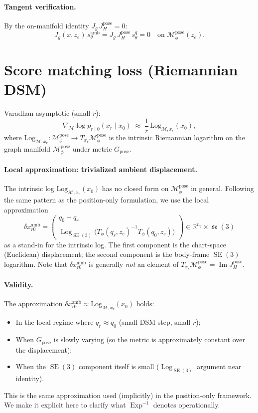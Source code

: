 \documentclass[11pt,a4paper]{article}
\DeclareMathOperator{\Exp}{Exp}
\DeclareMathOperator{\Log}{Log}
\DeclareMathOperator{\Image}{Im}
\DeclareMathOperator{\SE}{SE}
\DeclareMathOperator{\se}{\mathfrak{se}}
\newcommand{\R}{\mathbb{R}}
\newcommand{\Mset}{\mathcal{M}}
\newcommand{\Mpose}{\mathcal{M}_\phi^{\text{pose}}}
\newcommand{\Tphi}{T_\phi}
\begin{document}
\paragraph{Tangent verification.} By the on-manifold identity $J_g \, J_H^{\text{pose}} = 0$:
\begin{equation}
J_g(x, z_e) \, s_\theta^{\text{amb}} = J_g \, J_H^{\text{pose}} \, s_\theta^q = 0 \quad \text{on } \Mpose(z_e).
\end{equation}

\section{Score matching loss (Riemannian DSM)}
\label{sec:dsm}

Varadhan asymptotic (small $r$):
\begin{equation}
\nabla_{\Mset} \log p_{r \mid 0}(x_r \mid x_0) \;\approx\; \frac{1}{r} \, \mathrm{Log}_{\Mset, x_r}(x_0),
\end{equation}
where $\mathrm{Log}_{\Mset, x_r}: \Mpose \to T_{x_r} \Mpose$ is the intrinsic Riemannian logarithm on the graph manifold $\Mpose$ under metric $G_{\text{pose}}$.

\paragraph{Local approximation: trivialized ambient displacement.} The intrinsic log $\mathrm{Log}_{\Mset, x_r}(x_0)$ has no closed form on $\Mpose$ in general. Following the same pattern as the position-only formulation, we use the local approximation
\begin{equation}
\boxed{ \delta x^{\text{amb}}_{r0} = \begin{pmatrix} q_0 - q_r \\ \Log_{\SE(3)}\!\bigl( \Tphi(q_r, z_e)^{-1} \Tphi(q_0, z_e) \bigr) \end{pmatrix} \in \R^{n_q} \times \se(3) }
\end{equation}
as a stand-in for the intrinsic log. The first component is the chart-space (Euclidean) displacement; the second component is the body-frame $\SE(3)$ logarithm. Note that $\delta x^{\text{amb}}_{r0}$ is generally \emph{not} an element of $T_{x_r} \Mpose = \Image J_H^{\text{pose}}$.

\paragraph{Validity.} The approximation $\delta x^{\text{amb}}_{r0} \approx \mathrm{Log}_{\Mset, x_r}(x_0)$ holds:
\begin{itemize}[noitemsep]
    \item In the local regime where $q_r \approx q_0$ (small DSM step, small $r$);
    \item When $G_{\text{pose}}$ is slowly varying (so the metric is approximately constant over the displacement);
    \item When the $\SE(3)$ component itself is small ($\Log_{\SE(3)}$ argument near identity).
\end{itemize}
This is the same approximation used (implicitly) in the position-only framework. We make it explicit here to clarify what $\Exp^{-1}$ denotes operationally.
\end{document}
